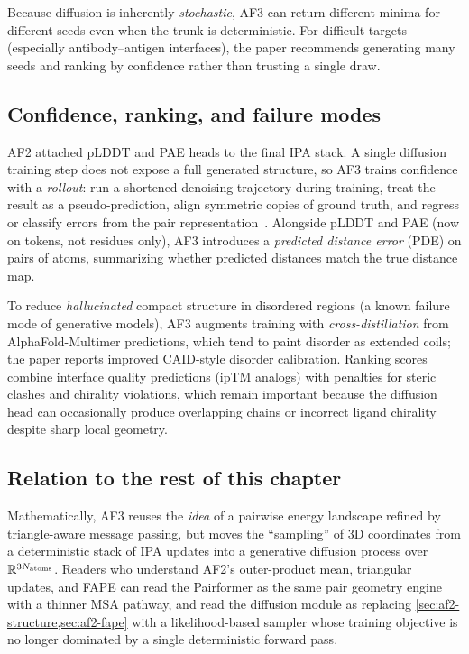Because diffusion is inherently \emph{stochastic}, AF3 can return different minima for different seeds even when the trunk is deterministic.
For difficult targets (especially antibody--antigen interfaces), the paper recommends generating many seeds and ranking by confidence rather than trusting a single draw.

\subsection*{Confidence, ranking, and failure modes}
\label{sec:af3-confidence}

AF2 attached pLDDT and PAE heads to the final IPA stack.
A single diffusion training step does not expose a full generated structure, so AF3 trains confidence with a \emph{rollout}: run a shortened denoising trajectory during training, treat the result as a pseudo-prediction, align symmetric copies of ground truth, and regress or classify errors from the pair representation~\cite{abramson2024}.
Alongside pLDDT and PAE (now on tokens, not residues only), AF3 introduces a \emph{predicted distance error} (PDE) on pairs of atoms, summarizing whether predicted distances match the true distance map.

To reduce \emph{hallucinated} compact structure in disordered regions (a known failure mode of generative models), AF3 augments training with \emph{cross-distillation} from AlphaFold-Multimer predictions, which tend to paint disorder as extended coils; the paper reports improved CAID-style disorder calibration.
Ranking scores combine interface quality predictions (ipTM analogs) with penalties for steric clashes and chirality violations, which remain important because the diffusion head can occasionally produce overlapping chains or incorrect ligand chirality despite sharp local geometry.

\subsection*{Relation to the rest of this chapter}
\label{sec:af3-relation}

Mathematically, AF3 reuses the \emph{idea} of a pairwise energy landscape refined by triangle-aware message passing, but moves the ``sampling'' of 3D coordinates from a deterministic stack of IPA updates into a generative diffusion process over $\mathbb{R}^{3N_\text{atoms}}$.
Readers who understand AF2's outer-product mean, triangular updates, and FAPE can read the Pairformer as the same pair geometry engine with a thinner MSA pathway, and read the diffusion module as replacing \cref{sec:af2-structure,sec:af2-fape} with a likelihood-based sampler whose training objective is no longer dominated by a single deterministic forward pass.



